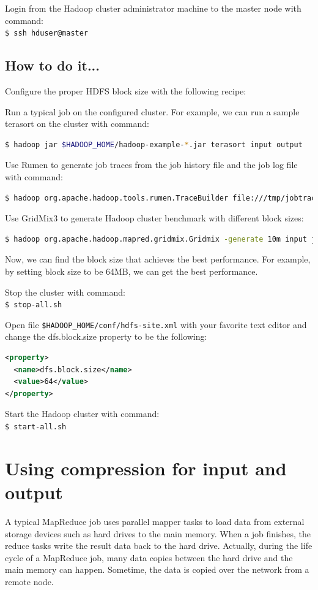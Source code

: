 Login from the Hadoop cluster administrator machine to the master node with command: \\
\verb|$ ssh hduser@master|
\subsection*{How to do it...}
Configure the proper HDFS block size with the following recipe:

Run a typical job on the configured cluster. For example, we can run a sample terasort on the cluster with command:
\lstset{style=bashstyle}
\begin{lstlisting}[language=bash]
$ hadoop jar $HADOOP_HOME/hadoop-example-*.jar terasort input output
\end{lstlisting}

Use Rumen to generate job traces from the job history file and the job log file with command:
\lstset{style=bashstyle}
\begin{lstlisting}[language=bash]
$ hadoop org.apache.hadoop.tools.rumen.TraceBuilder file:///tmp/jobtraces.json file:///tmp/topology.out file:///usr/local/hadoop/logs/history/done/ job_201304012206_0002_conf.xml
\end{lstlisting}

Use GridMix3 to generate Hadoop cluster benchmark with different block sizes:
\lstset{style=bashstyle}
\begin{lstlisting}[language=bash]
$ hadoop org.apache.hadoop.mapred.gridmix.Gridmix -generate 10m input jobtraces.json
\end{lstlisting}

Now, we can find the block size that achieves the best performance. For example, by setting block size to be 64MB, we can get the best performance.

Stop the cluster with command: \\
\verb|$ stop-all.sh|

Open file \verb|$HADOOP_HOME/conf/hdfs-site.xml| with your favorite text editor and change the dfs.block.size property to be the following:
\lstset{style=bashstyle}
\begin{lstlisting}[language=XML]
<property>
  <name>dfs.block.size</name>
  <value>64</value>
</property>
\end{lstlisting}

Start the Hadoop cluster with command:\\
\verb|$ start-all.sh|

\section{Using compression for input and output}
A typical MapReduce job uses parallel mapper tasks to load data from external storage devices such as hard drives to the main memory. When a job finishes, the reduce tasks write the result data back to the hard drive. Actually, during the life cycle of a MapReduce job, many data copies between the hard drive and the main memory can happen. Sometime, the data is copied over the network from a remote node.

